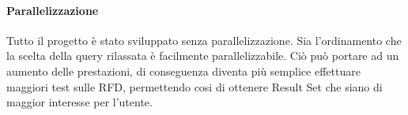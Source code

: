 \paragraph{Parallelizzazione}
Tutto il progetto è stato sviluppato senza parallelizzazione. Sia l'ordinamento che la scelta della query rilassata è facilmente parallelizzabile. Ciò può portare ad un aumento delle prestazioni, di conseguenza diventa più semplice effettuare maggiori test sulle RFD, permettendo cosi di ottenere Result Set che siano di maggior interesse per l'utente.